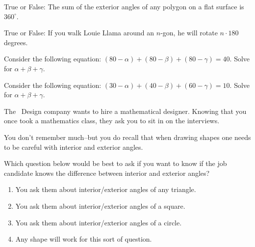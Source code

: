 \documentclass[noauthor,nooutcomes]{ximera}
\author{Claire Merriman and Bart Snapp}
\begin{document}
\maketitle

\begin{exercise}
  True or False:
 The sum of the exterior angles of any polygon on a flat surface is $360^\circ$.
\end{exercise}

\begin{exercise}
  True or False: If you walk Louie Llama around an $n$-gon, he will
  rotate $n\cdot 180$ degrees.
\end{exercise}




\begin{exercise}
 Consider the following equation: $(80-\alpha)+(80-\beta)+(80-\gamma)=40$. Solve for $\alpha+\beta+\gamma$.
\end{exercise}



\begin{exercise}
 Consider the following equation: $(30-\alpha)+(40-\beta)+(60-\gamma)=10$. Solve for $\alpha+\beta+\gamma$.
\end{exercise}


\begin{exercise}
The \MOOCulus~Design company wants to hire a mathematical
designer. Knowing that you once took a mathematics class, they ask you
to sit in on the interviews.


You don't remember much--but you do recall that when drawing shapes
one needs to be careful with interior and exterior angles.

 

Which question below would be best to ask if you want to know if the
job candidate knows the difference between interior and exterior
angles?

\begin{enumerate}
\item You ask them about interior/exterior angles of any
  triangle.
\item You ask them about interior/exterior angles of a square.
\item You ask them about interior/exterior angles of a circle.
\item Any shape will work for this sort of question.
\end{enumerate}

\end{exercise}






\end{document}
